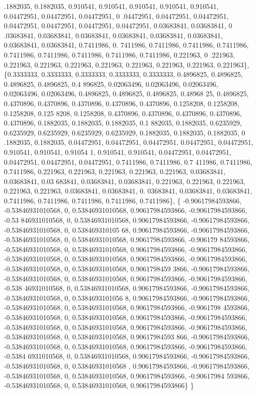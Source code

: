 \begin{DoxyCode}
      .1882035, 0.1882035, 0.910541, 0.910541, 0.910541, 0.910541, 0.910541, 0.04472951, 0.04472951, 0.04472951, 0
      .04472951, 0.04472951, 0.04472951, 0.04472951, 0.04472951, 0.04472951, 0.04472951, 0.03683841, 0.03683841, 0
      .03683841, 0.03683841, 0.03683841, 0.03683841, 0.03683841, 0.03683841, 0.03683841, 0.03683841, 0.7411986, 0.
      7411986, 0.7411986, 0.7411986, 0.7411986, 0.7411986, 0.7411986, 0.7411986, 0.7411986, 0.7411986, 0.221963, 0
      .221963, 0.221963, 0.221963, 0.221963, 0.221963, 0.221963, 0.221963, 0.221963, 0.221963\},
    \{0.3333333, 0.3333333, 0.3333333, 0.3333333, 0.3333333, 0.4896825, 0.4896825, 0.4896825, 0.4896825, 0.4
      896825, 0.02063496, 0.02063496, 0.02063496, 0.02063496, 0.02063496, 0.4896825, 0.4896825, 0.4896825, 0.48968
      25, 0.4896825, 0.4370896, 0.4370896, 0.4370896, 0.4370896, 0.4370896, 0.1258208, 0.1258208, 0.1258208, 0.125
      8208, 0.1258208, 0.4370896, 0.4370896, 0.4370896, 0.4370896, 0.4370896, 0.1882035, 0.1882035, 0.1882035, 0.1
      882035, 0.1882035, 0.6235929, 0.6235929, 0.6235929, 0.6235929, 0.6235929, 0.1882035, 0.1882035, 0.1882035, 0
      .1882035, 0.1882035, 0.04472951, 0.04472951, 0.04472951, 0.04472951, 0.04472951, 0.910541, 0.910541, 0.91054
      1, 0.910541, 0.910541, 0.04472951, 0.04472951, 0.04472951, 0.04472951, 0.04472951, 0.7411986, 0.7411986, 0.7
      411986, 0.7411986, 0.7411986, 0.221963, 0.221963, 0.221963, 0.221963, 0.221963, 0.03683841, 0.03683841, 0.03
      683841, 0.03683841, 0.03683841, 0.221963, 0.221963, 0.221963, 0.221963, 0.221963, 0.03683841, 0.03683841, 0.
      03683841, 0.03683841, 0.03683841, 0.7411986, 0.7411986, 0.7411986, 0.7411986, 0.7411986\},
    \{ -0.90617984593866, -0.53846931010568, 0, 0.53846931010568, 0.90617984593866, -0.90617984593866, -0.53
      846931010568, 0, 0.53846931010568, 0.90617984593866, -0.90617984593866, -0.53846931010568, 0, 0.538469310105
      68, 0.90617984593866, -0.90617984593866, -0.53846931010568, 0, 0.53846931010568, 0.90617984593866, -0.906179
      84593866, -0.53846931010568, 0, 0.53846931010568, 0.90617984593866, -0.90617984593866, -0.53846931010568, 0,
       0.53846931010568, 0.90617984593866, -0.90617984593866, -0.53846931010568, 0, 0.53846931010568, 0.9061798459
      3866, -0.90617984593866, -0.53846931010568, 0, 0.53846931010568, 0.90617984593866, -0.90617984593866, -0.538
      46931010568, 0, 0.53846931010568, 0.90617984593866, -0.90617984593866, -0.53846931010568, 0, 0.5384693101056
      8, 0.90617984593866, -0.90617984593866, -0.53846931010568, 0, 0.53846931010568, 0.90617984593866, -0.9061798
      4593866, -0.53846931010568, 0, 0.53846931010568, 0.90617984593866, -0.90617984593866, -0.53846931010568, 0, 
      0.53846931010568, 0.90617984593866, -0.90617984593866, -0.53846931010568, 0, 0.53846931010568, 0.90617984593
      866, -0.90617984593866, -0.53846931010568, 0, 0.53846931010568, 0.90617984593866, -0.90617984593866, -0.5384
      6931010568, 0, 0.53846931010568, 0.90617984593866, -0.90617984593866, -0.53846931010568, 0, 0.53846931010568
      , 0.90617984593866, -0.90617984593866, -0.53846931010568, 0, 0.53846931010568, 0.90617984593866, -0.90617984
      593866, -0.53846931010568, 0, 0.53846931010568, 0.90617984593866\}
  \}
\end{DoxyCode}
